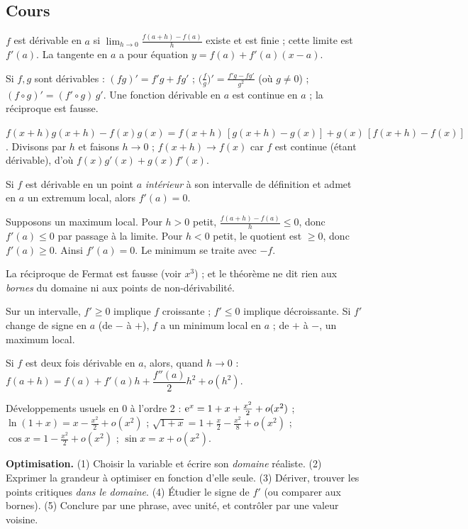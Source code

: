 \subsection{Cours}
\begin{definition}[Dérivée]
$f$ est dérivable en $a$ si $\displaystyle\lim_{h\to0}\frac{f(a+h)-f(a)}h$ existe et est finie ; cette limite est $f'(a)$. La tangente en $a$ a pour équation $y=f(a)+f'(a)(x-a)$.
\end{definition}
\begin{propriete}[Règles]
Si $f,g$ sont dérivables : $(fg)'=f'g+fg'$ ; $\big(\frac fg\big)'=\frac{f'g-fg'}{g^2}$ (où $g\ne0$) ; $(f\circ g)'=(f'\circ g)\,g'$. Une fonction dérivable en $a$ est continue en $a$ ; la réciproque est fausse.
\end{propriete}
\begin{demonstration}[produit]
$f(x+h)g(x+h)-f(x)g(x)=f(x+h)\,[g(x+h)-g(x)]+g(x)\,[f(x+h)-f(x)]$. Divisons par $h$ et faisons $h\to0$ ; $f(x+h)\to f(x)$ car $f$ est continue (étant dérivable), d'où $f(x)g'(x)+g(x)f'(x)$.
\end{demonstration}
\begin{propriete}
Si $f$ est dérivable en un point $a$ \emph{intérieur} à son intervalle de définition et admet en $a$ un extremum local, alors $f'(a)=0$.
\end{propriete}
\begin{demonstration}
Supposons un maximum local. Pour $h>0$ petit, $\frac{f(a+h)-f(a)}h\le0$, donc $f'(a)\le0$ par passage à la limite. Pour $h<0$ petit, le quotient est $\ge0$, donc $f'(a)\ge0$. Ainsi $f'(a)=0$. Le minimum se traite avec $-f$.
\end{demonstration}
\begin{piege}
La réciproque de Fermat est fausse (voir $x^3$) ; et le théorème ne dit rien aux \emph{bornes} du domaine ni aux points de non-dérivabilité.
\end{piege}
\begin{propriete}
Sur un intervalle, $f'\ge0$ implique $f$ croissante ; $f'\le0$ implique décroissante. Si $f'$ change de signe en $a$ (de $-$ à $+$), $f$ a un minimum local en $a$ ; de $+$ à $-$, un maximum local.
\end{propriete}
\begin{propriete}
Si $f$ est deux fois dérivable en $a$, alors, quand $h\to0$ : $f(a+h)=f(a)+f'(a)h+\dfrac{f''(a)}2h^2+o(h^2)$.
\end{propriete}
Développements usuels en $0$ à l'ordre 2 : $\mathrm{e}^x=1+x+\frac{x^2}2+o(x^2)$ ; $\ln(1+x)=x-\frac{x^2}2+o(x^2)$ ; $\sqrt{1+x}=1+\frac x2-\frac{x^2}8+o(x^2)$ ; $\cos x=1-\frac{x^2}2+o(x^2)$ ; $\sin x=x+o(x^2)$.
\begin{methode}
\textbf{Optimisation.} (1) Choisir la variable et écrire son \emph{domaine} réaliste. (2) Exprimer la grandeur à optimiser en fonction d'elle seule. (3) Dériver, trouver les points critiques \emph{dans le domaine}. (4) Étudier le signe de $f'$ (ou comparer aux bornes). (5) Conclure par une phrase, avec unité, et contrôler par une valeur voisine.
\end{methode}

